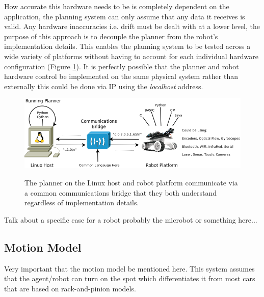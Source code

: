 \newpage

\noindent
How accurate this hardware needs to be is completely dependent on the application, the planning system can only assume that any data it receives is valid. Any hardware inaccuracies i.e. drift must be dealt with at a lower level, the purpose of this approach is to decouple the planner from the robot's implementation details. This enables the planning system to be tested across a wide variety of platforms without having to account for each individual hardware configuration (Figure \ref{Figure: Hardware Agent Specification.}). It is perfectly possible that the planner and robot hardware control be implemented on the same physical system rather than externally this could be done via IP using the \textit{localhost} address.

\begin{figure}[htbp]

\center \includegraphics[width=400pt]{illustrations/hardware_agent_specification}\\
\caption{The planner on the Linux host and robot platform communicate via a common communications bridge that they both understand regardless of implementation details.} 
\label{Figure: Hardware Agent Specification.}

\end{figure}

\noindent
Talk about a specific case for a robot probably the microbot or something here...


\subsection{Motion Model}
Very important that the motion model be mentioned here. This system assumes that the agent/robot can turn on the spot which differentiates it from most cars that are based on rack-and-pinion models.

\newpage

